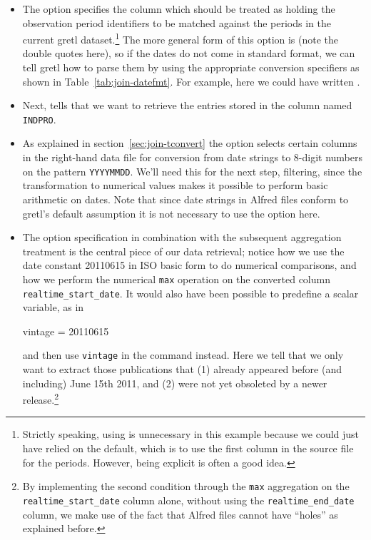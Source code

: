 \begin{itemize}
\item The  option specifies the column which should be
  treated as holding the observation period identifiers to be matched
  against the periods in the current gretl dataset.\footnote{Strictly
    speaking, using  is unnecessary in this example
    because we could just have relied on the default, which is to use
    the first column in the source file for the periods. However,
    being explicit is often a good idea.}  The more general form of
  this option is  (note the double
  quotes here), so if the dates do not come in standard format, we can
  tell gretl how to parse them by using the appropriate conversion
  specifiers as shown in Table~\ref{tab:join-datefmt}.  For example,
  here we could have written
  .
\item Next,  tells  that we want to
  retrieve the entries stored in the column named \texttt{INDPRO}.
\item As explained in section~\ref{sec:join-tconvert} the
   option selects certain columns in the right-hand
  data file for conversion from date strings to 8-digit numbers on the
  pattern \texttt{YYYYMMDD}.  We'll need this for the next step,
  filtering, since the transformation to numerical values makes it
  possible to perform basic arithmetic on dates.  Note that since
  date strings in Alfred files conform to gretl's default assumption
  it is not necessary to use the  option here.
\item The  option specification in combination with the 
  subsequent  aggregation treatment is the central piece of
  our data retrieval; notice how we use the date constant 20110615 in
  ISO basic form to do numerical comparisons, and how we perform the 
  numerical \texttt{max} operation on the converted column 
  \verb|realtime_start_date|. It would also have been possible to 
  predefine a scalar variable, as in
 \begin{code}
   vintage = 20110615
 \end{code}
  and then use \texttt{vintage} in the  command instead.
  Here we tell  that we only want to extract those
  publications that (1) already appeared before (and including) June 15th 2011, and
  (2) were not yet obsoleted by a newer release.\footnote{By implementing 
  the second condition through the \texttt{max} aggregation on the 
  \verb|realtime_start_date| column alone, without using the 
  \verb|realtime_end_date| column, we make use of the fact that Alfred
  files cannot have ``holes'' as explained before.}
\end{itemize}

